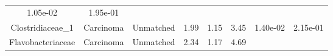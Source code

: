 \documentclass[12pt,]{article}
\begin{document}
\begin{longtable}[]{@{}cccccccc@{}}
\begin{minipage}[t]{0.06\columnwidth}
1.05e-02\strut
\end{minipage} & \begin{minipage}[t]{0.06\columnwidth}\centering\strut
1.95e-01\strut
\end{minipage}\tabularnewline
\begin{minipage}[t]{0.18\columnwidth}\centering\strut
Clostridiaceae\_1\strut
\end{minipage} & \begin{minipage}[t]{0.07\columnwidth}\centering\strut
Carcinoma\strut
\end{minipage} & \begin{minipage}[t]{0.09\columnwidth}\centering\strut
Unmatched\strut
\end{minipage} & \begin{minipage}[t]{0.03\columnwidth}\centering\strut
1.99\strut
\end{minipage} & \begin{minipage}[t]{0.14\columnwidth}\centering\strut
1.15\strut
\end{minipage} & \begin{minipage}[t]{0.14\columnwidth}\centering\strut
3.45\strut
\end{minipage} & \begin{minipage}[t]{0.06\columnwidth}\centering\strut
1.40e-02\strut
\end{minipage} & \begin{minipage}[t]{0.06\columnwidth}\centering\strut
2.15e-01\strut
\end{minipage}\tabularnewline
\begin{minipage}[t]{0.18\columnwidth}\centering\strut
Flavobacteriaceae\strut
\end{minipage} & \begin{minipage}[t]{0.07\columnwidth}\centering\strut
Carcinoma\strut
\end{minipage} & \begin{minipage}[t]{0.09\columnwidth}\centering\strut
Unmatched\strut
\end{minipage} & \begin{minipage}[t]{0.03\columnwidth}\centering\strut
2.34\strut
\end{minipage} & \begin{minipage}[t]{0.14\columnwidth}\centering\strut
1.17\strut
\end{minipage} & \begin{minipage}[t]{0.14\columnwidth}\centering\strut
4.69\strut
\end{minipage} & \begin{minipage}[t]{0.06\columnwidth}\centering\strut

\end{minipage}
\end{longtable}
\end{document}
